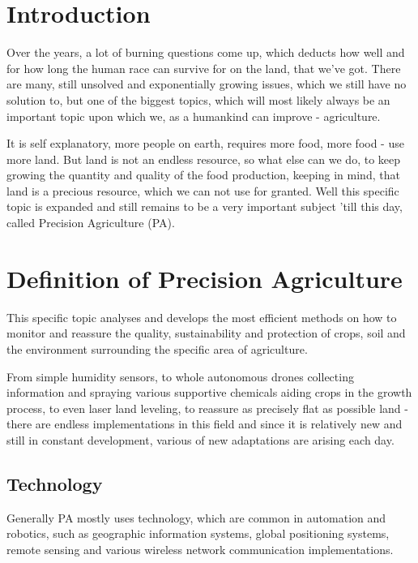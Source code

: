 \documentclass[11pt,a4paper,footinclude=true,headinclude=true, oneside]{scrbook}
\begin{document}
\chapter{Introduction}
	
Over the years, a lot of burning questions come up, which deducts how well and for how long the human race can survive for on the land, that we've got. There are many, still unsolved and exponentially growing issues, which we still have no solution to, but one of the biggest topics, which will most likely always be an important topic upon which we, as a humankind can improve - agriculture.
    
It is self explanatory, more people on earth, requires more food, more food - use more land. But land is not an endless resource, so what else can we do, to keep growing the quantity and quality of the food production, keeping in mind, that land is a precious resource, which we can not use for granted. Well this specific topic is expanded and still remains to be a very important subject 'till this day, called Precision Agriculture (PA).
    
    
\chapter{Definition of Precision Agriculture}
    
This specific topic analyses and develops the most efficient methods on how to monitor and reassure the quality, sustainability and protection of crops, soil and the environment surrounding the specific area of agriculture.
    
From simple humidity sensors, to whole autonomous drones collecting information and spraying various supportive chemicals aiding crops in the growth process, to even laser land leveling, to reassure as precisely flat as possible land - there are endless implementations in this field and since it is relatively new and still in constant development, various of new adaptations are arising each day.
    

\section{Technology}

Generally PA mostly uses technology, which are common in automation and robotics, such as geographic information systems, global positioning systems, remote sensing and various wireless network communication implementations.
\end{document}
